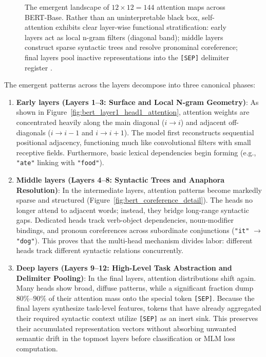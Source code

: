 \documentclass[../../main.tex]{subfiles}
\begin{document}
\begin{figure}[htbp]
{\begin{tikzpicture}
\end{tikzpicture}%
}
\caption{The emergent landscape of $12 \times 12 = 144$ attention maps across BERT-Base. Rather than an uninterpretable black box, self-attention exhibits clear layer-wise functional stratification: early layers act as local n-gram filters (diagonal band); middle layers construct sparse syntactic trees and resolve pronominal coreference; final layers pool inactive representations into the \texttt{[SEP]} delimiter register \cite{clark2019what, michel2019sixteen}.}
\label{fig:bert_all_attentions_grid}
\end{figure}

The emergent patterns across the layers decompose into three canonical phases:
\begin{enumerate}
    \item \textbf{Early layers (Layers 1--3: Surface and Local N-gram Geometry)}:
    As shown in Figure~\ref{fig:bert_layer1_head1_attention}, attention weights are concentrated heavily along the main diagonal ($i \to i$) and adjacent off-diagonals ($i \to i-1$ and $i \to i+1$). The model first reconstructs sequential positional adjacency, functioning much like convolutional filters with small receptive fields. Furthermore, basic lexical dependencies begin forming (e.g., \texttt{"ate"} linking with \texttt{"food"}).
    \item \textbf{Middle layers (Layers 4--8: Syntactic Trees and Anaphora Resolution)}:
    In the intermediate layers, attention patterns become markedly sparse and structured (Figure~\ref{fig:bert_coreference_detail}). The heads no longer attend to adjacent words; instead, they bridge long-range syntactic gaps. Dedicated heads track verb-object dependencies, noun-modifier bindings, and pronoun coreferences across subordinate conjunctions (\texttt{"it"} $\to$ \texttt{"dog"}). This proves that the multi-head mechanism divides labor: different heads track different syntactic relations concurrently.
    \item \textbf{Deep layers (Layers 9--12: High-Level Task Abstraction and Delimiter Pooling)}:
    In the final layers, attention distributions shift again. Many heads show broad, diffuse patterns, while a significant fraction dump $80\%\text{--}90\%$ of their attention mass onto the special token \texttt{[SEP]}. Because the final layers synthesize task-level features, tokens that have already aggregated their required syntactic context utilize \texttt{[SEP]} as an inert sink. This preserves their accumulated representation vectors without absorbing unwanted semantic drift in the topmost layers before classification or MLM loss computation.
\end{enumerate}
\end{document}
